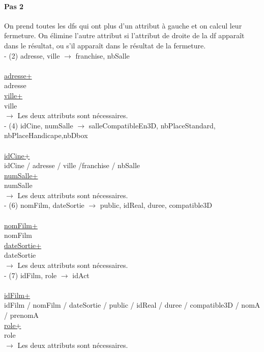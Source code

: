 \documentclass[a4paper,sffamily,12pt]{article}
\begin{document}
					\vspace{0.5cm}
										
				\paragraph{Pas 2}
	
					\vspace{0.5cm}
		
					On prend toutes les dfs qui ont plus d'un attribut à gauche et on calcul leur fermeture. On élimine l'autre attribut si l'attribut de droite de la df apparaît dans le résultat, ou s'il apparaît dans le résultat de la fermeture. \\
					
					\noindent - (2) adresse, ville $\rightarrow$ franchise, nbSalle \\
						\\
						\underline{adresse+} \\
						adresse \\
						\underline{ville+} \\
						ville \\
					$\rightarrow$ Les deux attributs sont nécessaires. \\
	
					\noindent - (4) idCine, numSalle $\rightarrow$ salleCompatibleEn3D, nbPlaceStandard, nbPlaceHandicape,nbDbox \\
						\\
						\underline{idCine+} \\
						idCine / adresse / ville /franchise / nbSalle \\
						\underline{numSalle+} \\
						numSalle \\
					$\rightarrow$ Les deux attributs sont nécessaires. \\
					
					\noindent - (6) nomFilm, dateSortie $\rightarrow$ public, idReal, duree, compatible3D \\																						\\
						\underline{nomFilm+} \\
						nomFilm \\
						\underline{dateSortie+} \\
						dateSortie \\
					$\rightarrow$ Les deux attributs sont nécessaires. \\
				
					\noindent - (7) idFilm, role $\rightarrow$  idAct \\
						\\
						\underline{idFilm+} \\
						idFilm / nomFilm / dateSortie / public / idReal / duree / compatible3D / nomA / prenomA \\
						\underline{role+} \\
						role \\
					$\rightarrow$ Les deux attributs sont nécessaires. \\
						
\end{document}
